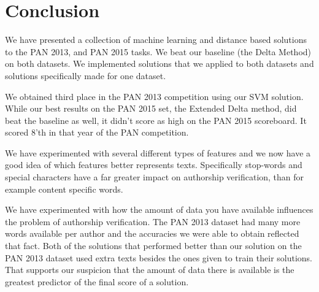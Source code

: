 \section{Conclusion} \label{sec:conclusion}

We have presented a collection of machine learning and distance based solutions
to the PAN 2013, and PAN 2015 tasks. We beat our baseline (the Delta Method) on
both datasets. We implemented solutions that we applied to both datasets and
solutions specifically made for one dataset.

We obtained third place in the PAN 2013 competition using our \gls{SVM}
solution. While our best results on the PAN 2015 set, the Extended Delta
method, did beat the baseline as well, it didn't score as high on the PAN 2015
scoreboard. It scored 8'th in that year of the PAN competition.

We have experimented with several different types of features and we now have
a good idea of which features better represents texts. Specifically stop-words
and special characters have a far greater impact on authorship verification,
than for example content specific words.

We have experimented with how the amount of data you have available influences
the problem of authorship verification. The PAN 2013 dataset had many more words
available per author and the accuracies we were able to obtain reflected that
fact. Both of the solutions that performed better than our solution on the PAN
2013 dataset used extra texts besides the ones given to train their solutions.
That supports our suspicion that the amount of data there is available
is the greatest predictor of the final score of a solution.
